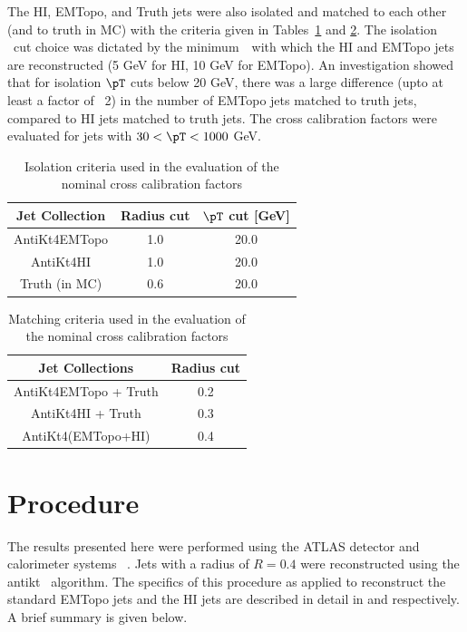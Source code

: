 The HI, EMTopo, and Truth jets were also isolated and matched to each other (and to truth in MC) with the criteria given in Tables~\ref{table:iso_criteria} and \ref{table:match_criteria}. The isolation \pt\ cut choice was dictated by the minimum\ \pT \ with which the HI and EMTopo jets are reconstructed (5 GeV for HI, 10 GeV for EMTopo). An investigation showed that for isolation $\pT$ cuts below 20 GeV, there was a large difference (upto at least a factor of ~2) in the number of EMTopo jets matched to truth jets, compared to HI jets matched to truth jets. The cross calibration factors were evaluated for jets with $30 < \pT < 1000 $ GeV.

\begin{table}[ht]
\caption{Isolation criteria used in the evaluation of the nominal cross calibration factors}
\centering
\begin{tabular}{c c c}
\hline\hline
Jet Collection & Radius cut & $\pT$ cut [GeV] \\ [0.5ex] %
\hline
AntiKt4EMTopo & 1.0 & 20.0 \\ 
AntiKt4HI & 1.0 & 20.0 \\ 
Truth (in MC) & 0.6 & 20.0 \\ 
\hline
\end{tabular}
\label{table:iso_criteria}
\end{table}

\begin{table}[ht]
\caption{Matching criteria used in the evaluation of the nominal cross calibration factors}
\centering
\begin{tabular}{c c}
\hline\hline
Jet Collections & Radius cut \\ [0.5ex] %
\hline
AntiKt4EMTopo + Truth & 0.2 \\ 
AntiKt4HI + Truth & 0.3 \\ 
AntiKt4(EMTopo+HI) & 0.4\\ 
\hline
\end{tabular}
\label{table:match_criteria}
\end{table}


\section{Procedure}
\label{sec:qual_procedure}

The results presented here were performed using the ATLAS detector and calorimeter systems ~\cite{Aad:2008zzm}. Jets with a radius of $R=0.4$ were reconstructed using the \\antikt \ algorithm.  The specifics of this procedure as applied to reconstruct the standard EMTopo jets and the HI jets are described in detail in \cite{Aad:2011he} and \cite{Aad:hi_jets} respectively. A brief summary is given below.

